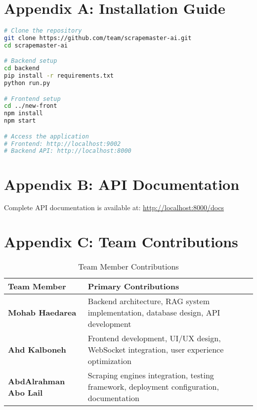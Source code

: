 \documentclass[12pt,a4paper]{report}
\begin{document}
\section*{Appendix A: Installation Guide}

\begin{lstlisting}[language=bash, caption=Installation Commands]
# Clone the repository
git clone https://github.com/team/scrapemaster-ai.git
cd scrapemaster-ai

# Backend setup
cd backend
pip install -r requirements.txt
python run.py

# Frontend setup
cd ../new-front
npm install
npm start

# Access the application
# Frontend: http://localhost:9002
# Backend API: http://localhost:8000
\end{lstlisting}

\section*{Appendix B: API Documentation}

Complete API documentation is available at: \url{http://localhost:8000/docs}

\section*{Appendix C: Team Contributions}

\begin{table}[H]
    \centering
    \caption{Team Member Contributions}
    \begin{tabular}{|l|p{8cm}|}
        \hline
        \rowcolor{primaryblue!20}
        \textbf{Team Member} & \textbf{Primary Contributions} \\
        \hline
        \textbf{Mohab Haedarea} & Backend architecture, RAG system implementation, database design, API development \\
        \hline
        \textbf{Ahd Kalboneh} & Frontend development, UI/UX design, WebSocket integration, user experience optimization \\
        \hline
        \textbf{AbdAlrahman Abo Lail} & Scraping engines integration, testing framework, deployment configuration, documentation \\
        \hline
    \end{tabular}
\end{table}
\end{document}
